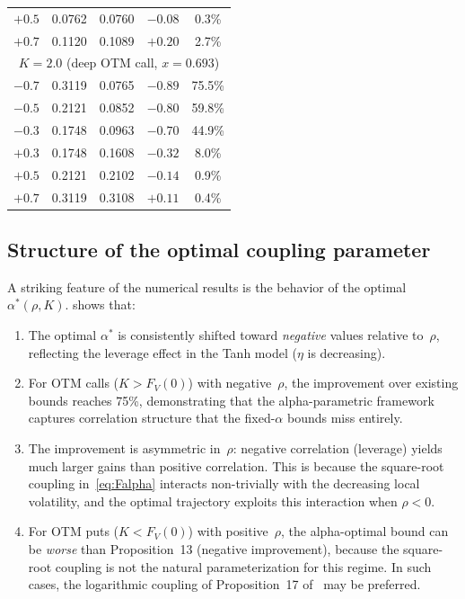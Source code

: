 \documentclass[12pt]{article}
\begin{document}
\begin{table}[h!]
\begin{tabular}{r|c|cc|c}
$+0.5$ & 0.0762 & 0.0760 & $-0.08$ & 0.3\% \\
$+0.7$ & 0.1120 & 0.1089 & $+0.20$ & 2.7\% \\
\hline
\multicolumn{5}{c}{$K=2.0$ (deep OTM call, $x=0.693$)} \\
\hline
$-0.7$ & 0.3119 & 0.0765 & $-0.89$ & 75.5\% \\
$-0.5$ & 0.2121 & 0.0852 & $-0.80$ & 59.8\% \\
$-0.3$ & 0.1748 & 0.0963 & $-0.70$ & 44.9\% \\
$+0.3$ & 0.1748 & 0.1608 & $-0.32$ & 8.0\% \\
$+0.5$ & 0.2121 & 0.2102 & $-0.14$ & 0.9\% \\
$+0.7$ & 0.3119 & 0.3108 & $+0.11$ & 0.4\% \\
\hline
\end{tabular}
\end{table}

\subsection{Structure of the optimal coupling parameter}

A striking feature of the numerical results is the behavior of the optimal
$\alpha^*(\rho,K)$.  shows that:
\begin{enumerate}
\item The optimal $\alpha^*$ is consistently shifted toward \emph{negative} values
  relative to~$\rho$, reflecting the leverage effect in the Tanh model
  ($\eta$ is decreasing).
\item For OTM calls ($K > F_V(0)$) with negative~$\rho$, the improvement over
  existing bounds reaches 75\%, demonstrating that the alpha-parametric framework
  captures correlation structure that the fixed-$\alpha$ bounds miss entirely.
\item The improvement is asymmetric in~$\rho$: negative correlation (leverage)
  yields much larger gains than positive correlation. This is because the
  square-root coupling in~\eqref{eq:Falpha} interacts non-trivially with
  the decreasing local volatility, and the optimal trajectory exploits this
  interaction when $\rho < 0$.
\item For OTM puts ($K < F_V(0)$) with positive~$\rho$, the alpha-optimal bound
  can be \emph{worse} than Proposition~13 (negative improvement), because
  the square-root coupling is not the natural parameterization for this regime.
  In such cases, the logarithmic coupling of Proposition~17 of~\cite{PWZ2025}
  may be preferred.
\end{enumerate}
\end{document}
